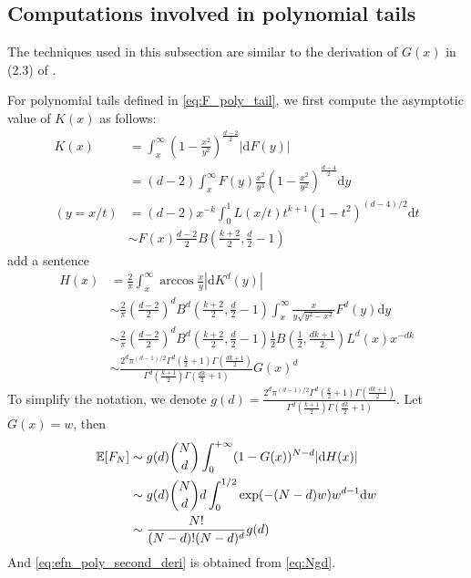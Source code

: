 \documentclass{aptpub}
\def\E{\mathbb{E}}
\def\d{\mathrm{d}}
\begin{document}
\subsection{Computations involved in polynomial tails}
The techniques used in this subsection are similar to the derivation of $G(x)$
in (2.3) of \cite{carnal1970konvexe}.

For polynomial tails defined in \eqref{eq:F_poly_tail},
we first compute the asymptotic value of $K(x)$
as follows:
\begin{align*}
     K(x) & = \int_x^{\infty} (1-\frac{x^2}{y^2})^{\frac{d-2}{2}} |\d F(y)| \\
     &= (d-2)\int_x^{\infty} F(y)\frac{x^2}{y^3} (1-\frac{x^2}{y^2})^{\frac{d-4}{2}} \d y\\
     (y=x/t) &= (d-2)x^{-k} \int_0^{1} L(x/t) t^{k+1} (1-t^2)^{(d-4)/2}\d t \\
     & \sim F(x) \frac{d-2}{2} B\left(\frac{k+2}{2}, \frac{d}{2}-1\right) 
\end{align*}
add a sentence
\begin{align*}
     H(x) &= \frac{2}{\pi}
     \int_x^{\infty} \arccos\frac{x}{y}
     |\d K^d(y)| \\
     &\sim \frac{2}{\pi}\left(\frac{d-2}{2}\right)^d
     B^d\left(\frac{k+2}{2}, \frac{d}{2}-1\right)
     \int_x^{\infty} \frac{x}{y \sqrt{y^2-x^2}} F^d(y) \d y \\
     &\sim \frac{2}{\pi}\left(\frac{d-2}{2}\right)^d
     B^d\left(\frac{k+2}{2}, \frac{d}{2}-1\right) \frac{1}{2}
     B\left(\frac{1}{2}, \frac{dk+1}{2}\right)L^d(x) x^{-dk} \\
     &\sim \frac{2^d \pi^{(d-1)/2}\Gamma^d(\frac{k}{2}+1)
     \Gamma(\frac{dk+1}{2})}{
         \Gamma^d(\frac{k+1}{2}) \Gamma(\frac{dk}{2}+1)} G(x)^d 
\end{align*}
To simplify the notation, we denote $g(d)=\frac{2^d \pi^{(d-1)/2}\Gamma^d(\frac{k}{2}+1)
\Gamma(\frac{dk+1}{2})}{
    \Gamma^d(\frac{k+1}{2}) \Gamma(\frac{dk}{2}+1)}$.
Let $G(x)=w$, then
\begin{align}
     \E[F_N] &\sim g(d)\binom{N}{d} \int_0^{+\infty} 
      (1-G(x))^{N-d} |\d H(x)| \notag \\
      &\sim g(d)\binom{N}{d}d\int_0^{1/2} \exp(-(N-d)w)w^{d-1}\d w
      \notag \\
      &\sim \frac{N!}{(N-d)! (N-d)^d}g(d) \label{eq:Ngd}
\end{align}
And \eqref{eq:efn_poly_second_deri} is obtained from \eqref{eq:Ngd}.
\end{document}
